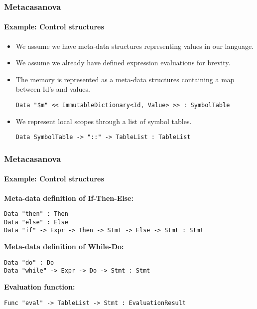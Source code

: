 \documentclass[10pt,a4paper]{beamer}
\begin{document}
\begin{frame}[fragile]
\frametitle{Metacasanova}
\framesubtitle{Example: Control structures}
\begin{itemize}
	\item We assume we have meta-data structures representing values in our language.
	\item We assume we already have defined expression evaluations for brevity.
	\item The memory is represented as a meta-data structures containing a map between Id's and values.	
	\begin{lstlisting}
Data "$m" << ImmutableDictionary<Id, Value> >> : SymbolTable
	\end{lstlisting}
	\item We represent local scopes through a list of symbol tables.
	\begin{lstlisting}
Data SymbolTable -> "::" -> TableList : TableList
	\end{lstlisting}
\end{itemize}
\end{frame}

\begin{frame}[fragile]
\frametitle{Metacasanova}
\framesubtitle{Example: Control structures}
\textbf{Meta-data definition of If-Then-Else:}
\begin{lstlisting}
Data "then" : Then
Data "else" : Else
Data "if" -> Expr -> Then -> Stmt -> Else -> Stmt : Stmt
\end{lstlisting}

\textbf{Meta-data definition of While-Do:}
\begin{lstlisting}
Data "do" : Do
Data "while" -> Expr -> Do -> Stmt : Stmt
\end{lstlisting}

\textbf{Evaluation function:}
\begin{lstlisting}
Func "eval" -> TableList -> Stmt : EvaluationResult
\end{lstlisting}
\end{frame}
\end{document}
